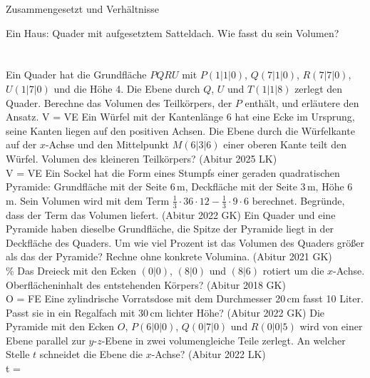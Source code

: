 \setcounter{aufgabe}{16}

\begin{aufgabe}{Zusammengesetzt und Verhältnisse}
\begin{teile}
\teil Ein Haus: Quader mit aufgesetztem Satteldach. Wie fasst du sein Volumen? \\  \\  \\ 
\teil Ein Quader hat die Grundfläche $PQRU$ mit $P(1 | 1 | 0)$, $Q(7 | 1 | 0)$, $R(7 | 7 | 0)$, $U(1 | 7 | 0)$ und die Höhe 4. Die Ebene durch $Q$, $U$ und $T(1 | 1 | 8)$ zerlegt den Quader. Berechne das Volumen des Teilkörpers, der $P$ enthält, und erläutere den Ansatz. V = \leerfeld VE
\teil Ein Würfel mit der Kantenlänge 6 hat eine Ecke im Ursprung, seine Kanten liegen auf den positiven Achsen. Die Ebene durch die Würfelkante auf der $x$-Achse und den Mittelpunkt $M(6 | 3 | 6)$ einer oberen Kante teilt den Würfel. Volumen des kleineren Teilkörpers? \hfill (Abitur 2025 LK) \\ V = \leerfeld VE
\teil Ein Sockel hat die Form eines Stumpfs einer geraden quadratischen Pyramide: Grundfläche mit der Seite 6\,m, Deckfläche mit der Seite 3\,m, Höhe 6\,m. Sein Volumen wird mit dem Term $\tfrac{1}{3} \cdot 36 \cdot 12 - \tfrac{1}{3} \cdot 9 \cdot 6$ berechnet. Begründe, dass der Term das Volumen liefert. \hfill (Abitur 2022 GK)
\teil Ein Quader und eine Pyramide haben dieselbe Grundfläche, die Spitze der Pyramide liegt in der Deckfläche des Quaders. Um wie viel Prozent ist das Volumen des Quaders größer als das der Pyramide? Rechne ohne konkrete Volumina. \hfill (Abitur 2021 GK) \\ \leerfeld \%
\teil Das Dreieck mit den Ecken $(0 | 0)$, $(8 | 0)$ und $(8 | 6)$ rotiert um die $x$-Achse. Oberflächeninhalt des entstehenden Körpers? \hfill (Abitur 2018 GK) \\ O = \leerfeld FE
\teil Eine zylindrische Vorratsdose mit dem Durchmesser 20\,cm fasst 10 Liter. Passt sie in ein Regalfach mit 30\,cm lichter Höhe? \hfill (Abitur 2022 GK)
\teil Die Pyramide mit den Ecken $O$, $P(6 | 0 | 0)$, $Q(0 | 7 | 0)$ und $R(0 | 0 | 5)$ wird von einer Ebene parallel zur $y$-$z$-Ebene in zwei volumengleiche Teile zerlegt. An welcher Stelle $t$ schneidet die Ebene die $x$-Achse? \hfill (Abitur 2022 LK) \\ t = \leerfeld
\end{teile}
\end{aufgabe}

